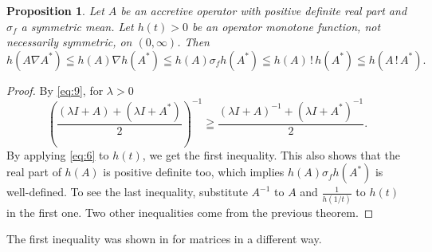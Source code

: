 \documentclass[reqno]{amsart}
\newtheorem{proposition}[theorem]{Proposition}
\theoremstyle{definition}
\theoremstyle{remark}
\begin{document}
\begin{proposition}\label{Prop:6-5} Let $A$ be an accretive operator with positive definite real part and 
$\sigma _f$ a symmetric mean.
Let $h(t)> 0$ be an operator monotone function, not necessarily symmetric,
 on $(0, \infty)$. Then 
$$h(A\nabla A^*) \leqq h(A)\nabla h(A^*)\leqq h(A) \sigma _f  h(A^*)
 \leqq h(A) \,!\, h(A^*) \leqq h(A \,!\, A^*).$$
\end{proposition}
 \begin{proof}
By \eqref{eq:9}, for $\lambda > 0$
$$\left(\frac{(\lambda I + A) + (\lambda I + A^*)}{2}\right) ^{-1} \geqq 
\frac{(\lambda I + A)^{-1} + (\lambda I + A^*)^{-1}}{2}.$$
By applying \eqref{eq:6} to $h(t)$, we get the first inequality. This also shows that the real part of 
 $h(A)$ is positive definite too, which implies $h(A) \sigma _f  h(A^*)$ is well-defined.
 To see the last inequality, 
substitute $A^{-1}$ to $A$  and $\frac{1}{h(1/t)}$ to $h(t)$ in the first one.
Two other inequalities come from the previous theorem.
\end{proof}
The first inequality was shown in \cite{BKS1} for matrices in a different way. 
\end{document}
